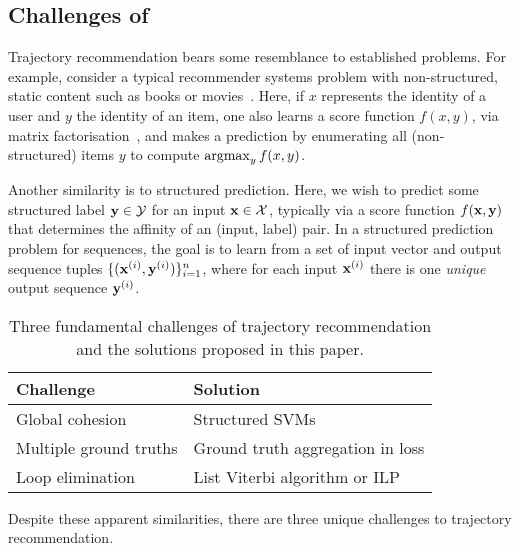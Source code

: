 \subsection{Challenges of {\trajrec}}

Trajectory recommendation bears some resemblance to established problems. %
For example, 
consider a typical recommender systems problem
with non-structured, {static} content such as books or movies~\citep{Goldberg:1992,Sarwar:2001,Netflix}.
Here, if $x$ represents the identity of a user and $y$ the identity of an item,
one also learns a score function $f( x, y )$, \eg via matrix factorisation~\citep{Koren:2009},
and makes a prediction by enumerating all ({non-structured}) items $y$ to compute $\operatorname*{argmax}_y f(x,y)$.

Another similarity is to structured prediction.
Here, we wish to predict some structured label $\mathbf{y} \in \mathcal{Y}$ for an input $\mathbf{x} \in \mathcal{X}$,
typically via a score function $f(\mathbf{x},\mathbf{y})$ that determines the affinity of an (input, label) pair.
In a structured prediction problem for sequences, the goal is to learn from a set of input vector and output sequence tuples
$\{ (\mathbf{x}^{({i})}, \mathbf{y}^{({i})}) \}_{i = 1}^n$, where
for each input $\mathbf{x}^{({i})}$ there is one \emph{unique} output sequence $\mathbf{y}^{({i})}$.


\begin{table}[t]
	\centering
	\begin{tabular}{ll}
	\hline
	\hline
	{\bf Challenge}                    & {\bf Solution}                             \\ \hline
	Global cohesion                    & Structured SVMs                            \\ \hline
	Multiple ground truths             & Ground truth aggregation in loss 			\\ \hline
	Loop elimination                   & List Viterbi algorithm or ILP              \\ \hline
	\end{tabular}
	\caption{Three fundamental challenges of trajectory recommendation and the solutions proposed in this paper.}
	\label{tbl:challenges}
\end{table}

Despite these apparent similarities,
there are three unique challenges to trajectory recommendation.


